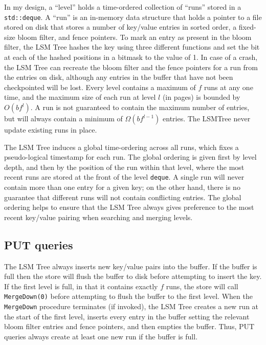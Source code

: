 \documentclass{acm}
\begin{document}

In my design, a ``level'' holds a time-ordered collection of ``runs'' stored in a \texttt{std::deque}. A ``run'' is an in-memory data structure that holds a pointer to a file stored on disk that stores a number of key/value entries in sorted order, a fixed-size bloom filter, and fence pointers. To mark an entry as present in the bloom filter, the LSM Tree hashes the key using three different functions and set the bit at each of the hashed positions in a bitmask to the value of 1. In case of a crash, the LSM Tree can recreate the bloom filter and the fence pointers for a run from the entries on disk, although any entries in the buffer that have not been checkpointed will be lost. Every level contains a maximum of $f$ runs at any one time, and the maximum size of each run at level $l$ (in pages) is bounded by $O(bf^l)$. A run is not guaranteed to contain the maximum number of entries, but will always contain a minimum of $\Omega(bf^{l-1})$ entries. The LSMTree never update existing runs in place.

The LSM Tree induces a global time-ordering across all runs, which fixes a pseudo-logical timestamp for each run. The global ordering is given first by level depth, and then by the position of the run within that level, where the most recent runs are stored at the front of the level \texttt{deque}. A single run will never contain more than one entry for a given key; on the other hand, there is no guarantee that different runs will not contain conflicting entries. The global ordering helps to ensure that the LSM Tree always gives preference to the most recent key/value pairing when searching and merging levels.

\subsection{PUT queries}

The LSM Tree always inserts new key/value pairs into the buffer. If the buffer is full then the store will flush the buffer to disk before attempting to insert the key. If the first level is full, in that it contains exactly $f$ runs, the store will call \texttt{MergeDown(0)} before attempting to flush the buffer to the first level. When the \texttt{MergeDown} procedure terminates (if invoked), the LSM Tree creates a new run at the start of the first level, inserts every entry in the buffer setting the relevant bloom filter entries and fence pointers, and then empties the buffer. Thus, PUT queries always create at least one new run if the buffer is full.
\end{document}
